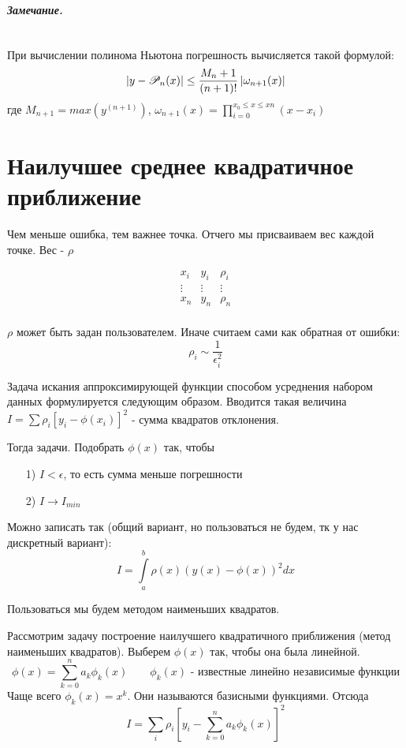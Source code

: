 \paragraph*{Замечание.} ${}$ \newline

При вычислении полинома Ньютона погрешность вычисляется такой формулой:
\[
\left| y - \mathscr{P}_n(x) \right| \le \frac{M_n + 1}{(n+1)!}\left| \omega_{n+1}(x) \right| 
\] 
где $M_{n+1} = max(y^{(n+1)})$, $\omega_{n+1}(x) = \prod\limits_{i=0}^{x_0\le x\le xn} (x- x_{i})$

\chapter{Наилучшее среднее квадратичное приближение}

Чем меньше ошибка, тем важнее точка. Отчего мы присваиваем вес каждой точке. Вес - $\rho$

 \[
\begin{matrix}
    x_{i} & y_{i} & \rho_i\\
    \vdots & \vdots & \vdots\\
    x_{n} & y_{n} & \rho_n\\
\end{matrix}
\] 

$\rho$ может быть задан пользователем. Иначе считаем сами как обратная от ошибки:
 \[
\rho_i \sim \frac{1}{\epsilon_i^2}
\] 

Задача искания аппроксимирующей функции способом усреднения набором данных формулируется
следующим образом. Вводится такая величина $I = \sum\limits \rho_i[y_{i} - \phi(x_{i})]^2$ - 
сумма квадратов отклонения.

Тогда задачи. Подобрать $\phi(x)$ так, чтобы
\begin{itemize}
    \item[1)] $I < \epsilon$, то есть сумма меньше погрешности
    \item[2)] $I \to I_{min}$
\end{itemize}

Можно записать так (общий вариант, но пользоваться не будем, тк у нас дискретный вариант):
\[
I = \int\limits_{a}^{b}\rho(x)(y(x) - \phi(x))^2dx
\] 

Пользоваться мы будем методом наименьших квадратов.

\medskip

Рассмотрим задачу построение наилучшего квадратичного приближения (метод наименьших квадратов).
Выберем $\phi(x)$ так, чтобы она была линейной.
 \[
     \phi(x) = \sum\limits_{k=0}^{n} a_k\phi_k(x) \quad\quad \phi_k(x)\text{ - известные линейно
     независимые функции}
\]
Чаще всего $\phi_k(x) = x^{k}$. Они называются базисными функциями. Отсюда
\[
    I = \sum\limits_{i}\rho_i\left[y_{i} - \sum\limits_{k=0}^{n}a_k\phi_k(x)\right]^2
\]

